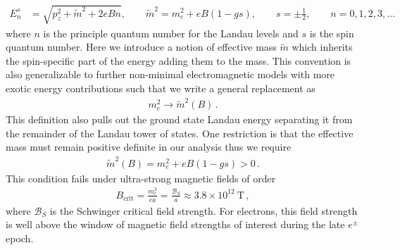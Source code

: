 \documentclass[universe,article,submit,moreauthors,pdftex,a4paper]{Definitions/mdpi}
\begin{document}
\begin{align}
  \label{KGPEnergy} E_{n}^{s}&=\sqrt{p^2_z+\tilde{m}^2+2eBn},\qquad\tilde{m}^2=m^2_e+eB\left(1-gs\right),\qquad s=\pm\frac{1}{2},\qquad n=0,1,2,3,\dots
\end{align}
where $n$ is the principle quantum number for the Landau levels and $s$ is the spin quantum number. Here we introduce a notion of effective mass $\tilde{m}$ which inherits the spin-specific part of the energy adding them to the mass. This convention is also generalizable to further non-minimal electromagnetic models with more exotic energy contributions such that we write a general replacement as
\begin{align}
  \label{MagMass} m_{e}^{2}\rightarrow\tilde{m}^2(B)\,.
\end{align}
This definition also pulls out the ground state Landau energy separating it from the remainder of the Landau tower of states. One restriction is that the effective mass must remain positive definite in our analysis thus we require
\begin{align}
  \label{MassLimit} \tilde{m}^2(B)=m^2_e+eB\left(1-gs\right)>0\,.
\end{align}
This condition fails under ultra-strong magnetic fields of order
\begin{align}
  \label{MagMassFail} B_{\mathrm{crit}}=\frac{m_{e}^{2}}{ea}=\frac{\mathcal{B}_{S}}{a}\approx3.8\times10^{12}\ \mathrm{T}\,,
\end{align}
where $\mathcal{B}_{S}$ is the Schwinger critical field strength. For electrons, this field strength is well above the window of magnetic field strengths of interest during the late $e^{\pm}$ epoch.

\end{document}
